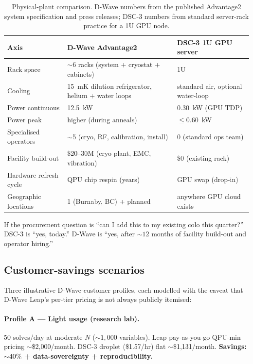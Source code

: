 \documentclass[11pt,a4paper]{article}
\begin{document}
\begin{table}[h]
\centering
\caption{Physical-plant comparison. D-Wave numbers from the published
Advantage2 system specification and press releases; DSC-3 numbers from
standard server-rack practice for a 1U GPU node.}
\label{tab:footprint}
\small
\begin{tabular}{lll}
\toprule
Axis & D-Wave Advantage2 & DSC-3 1U GPU server \\
\midrule
Rack space             & $\sim$6 racks (system + cryostat + cabinets) & 1U \\
Cooling                & 15~mK dilution refrigerator, helium + water loops & standard air, optional water-loop \\
Power continuous       & 12.5~kW                                           & 0.30~kW (GPU TDP) \\
Power peak             & higher (during anneals)                          & $\le$0.60~kW \\
Specialised operators  & $\sim$5 (cryo, RF, calibration, install)         & 0 (standard ops team) \\
Facility build-out     & \$20--30M (cryo plant, EMC, vibration)            & \$0 (existing rack) \\
Hardware refresh cycle & QPU chip respin (years)                          & GPU swap (drop-in) \\
Geographic locations   & 1 (Burnaby, BC) + planned                        & anywhere GPU cloud exists \\
\bottomrule
\end{tabular}
\end{table}

If the procurement question is ``can I add this to my existing colo
this quarter?'' DSC-3 is ``yes, today.'' D-Wave is ``yes, after
$\sim 12$ months of facility build-out and operator hiring.''

\subsection{Customer-savings scenarios}
\label{sec:savings_scenarios}

Three illustrative D-Wave-customer profiles, each modelled with the
caveat that D-Wave Leap's per-tier pricing is not always publicly
itemised:

\paragraph{Profile A --- Light usage (research lab).}
50 solves/day at moderate $N$ ($\sim 1{,}000$ variables). Leap
pay-as-you-go QPU-min pricing $\sim$\$2{,}000/month. DSC-3 droplet
(\$1.57/hr) flat $\sim$\$1{,}131/month. \textbf{Savings: $\sim 40\%$
+ data-sovereignty + reproducibility.}
\end{document}
